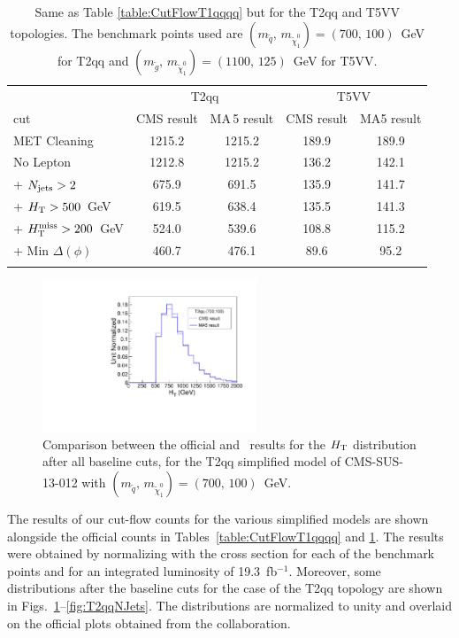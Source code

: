 \begin{table}[!t]
\caption{Same as Table \ref{table:CutFlowT1qqqq}  but for the T2qq and T5VV topologies. 
The benchmark points used are $(m_{\tilde q},\,m_{\tilde\chi^0_1})=(700,\,100)$~GeV for T2qq and $(m_{\tilde g},\,m_{\tilde\chi^0_1})=(1100,\,125)$~GeV for T5VV.
\label{table:CutFlowT5VV}}
\begin{center}
\begin{tabular}{ l ||c|c||c|c}
\hline\noalign{\smallskip}
& \multicolumn{2}{|c||}{T2qq} & \multicolumn{2}{c}{T5VV}  \\
cut & CMS result & {\sc MA}\,5 result & CMS result & {\sc MA}5 result \\ 
\hline\noalign{\smallskip}
MET Cleaning & 1215.2 & 1215.2 &  189.9 & 189.9     \\ 
No Lepton   & 1212.8 & 1215.2  & 136.2  & 142.1  \\
+ $N_{\rm jets}>2$        & 675.9 & 691.5  &135.9  & 141.7  \\
+ $H_{\rm T} > 500$~GeV   & 619.5 & 638.4   & 135.5  & 141.3 \\
+ $H_{\text{T}}^{\rm miss} >200$~GeV   & 524.0 & 539.6   & 108.8 & 115.2   \\
+ Min $\Delta(\phi)$ & 460.7 & 476.1  & 89.6 & 95.2 \\
\noalign{\smallskip}\hline
\end{tabular}
\end{center}
\end{table}

\begin{figure}[!b]
\centering
\includegraphics[width=6.4cm]{figures/madanalysis5/cms-012-T2qqHT.pdf}
\caption{Comparison between the official and \ma\ results  for the $H_{\rm T}$ distribution after all baseline cuts, 
for the T2qq simplified model of CMS-SUS-13-012 with $(m_{\tilde q},\,m_{\tilde\chi^0_1})=(700,\,100)$~GeV.}
\label{fig:T2qqHT}
\end{figure}

The results of our cut-flow counts for the various simplified models are shown alongside the official counts in 
Tables~\ref{table:CutFlowT1qqqq}  and \ref{table:CutFlowT5VV}. The results 
were obtained by normalizing with the cross section for each 
of the benchmark points and for an integrated luminosity of 19.3~fb$^{-1}$.
Moreover, some distributions after the baseline cuts for the case of the T2qq topology 
are shown in Figs.~\ref{fig:T2qqHT}--\ref{fig:T2qqNJets}. 
The distributions are normalized to unity and overlaid on the official plots obtained from the collaboration.



